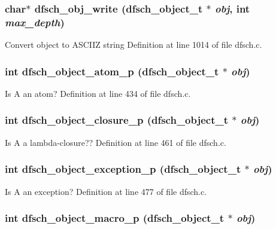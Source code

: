 \subsubsection{\setlength{\rightskip}{0pt plus 5cm}char$\ast$ dfsch\_\-obj\_\-write ({\bf dfsch\_\-object\_\-t} $\ast$ {\em obj}, int {\em max\_\-depth})}\label{dfsch_8h_a22}


Convert object to ASCIIZ string Definition at line 1014 of file dfsch.c.
\subsubsection{\setlength{\rightskip}{0pt plus 5cm}int dfsch\_\-object\_\-atom\_\-p ({\bf dfsch\_\-object\_\-t} $\ast$ {\em obj})}\label{dfsch_8h_a12}


Is A an atom? Definition at line 434 of file dfsch.c.
\subsubsection{\setlength{\rightskip}{0pt plus 5cm}int dfsch\_\-object\_\-closure\_\-p ({\bf dfsch\_\-object\_\-t} $\ast$ {\em obj})}\label{dfsch_8h_a17}


Is A a lambda-closure?? Definition at line 461 of file dfsch.c.
\subsubsection{\setlength{\rightskip}{0pt plus 5cm}int dfsch\_\-object\_\-exception\_\-p ({\bf dfsch\_\-object\_\-t} $\ast$ {\em obj})}\label{dfsch_8h_a20}


Is A an exception? Definition at line 477 of file dfsch.c.
\subsubsection{\setlength{\rightskip}{0pt plus 5cm}int dfsch\_\-object\_\-macro\_\-p ({\bf dfsch\_\-object\_\-t} $\ast$ {\em obj})}\label{dfsch_8h_a19}


